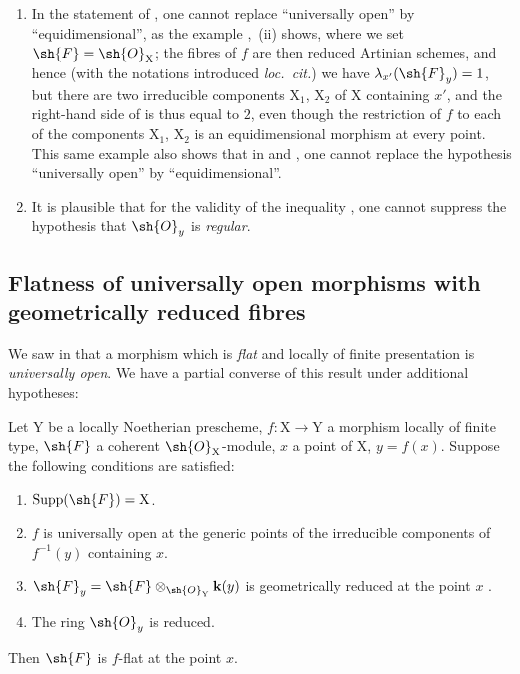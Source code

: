 \begin{remarks}[15.1.4]
\label{IV.15.1.4}
\begin{enumerate}[label=(\roman*)]
  \item In the statement of , one cannot replace ``universally open'' by ``equidimensional'', as the example ,~(ii) shows, where we set $\sh{F}=\sh{O}_\mathrm{X}$; the fibres of $f$ are then reduced Artinian schemes, and hence (with the notations introduced \emph{loc.\ cit.}) we have $\lambda_{x'}(\sh{F}_y)=1$, but there are two irreducible components $\mathrm{X}_1$, $\mathrm{X}_2$ of $\mathrm{X}$ containing $x'$, and the right-hand side of  is thus equal to $2$, even though the restriction of $f$ to each of the components $\mathrm{X}_1$, $\mathrm{X}_2$ is an equidimensional morphism at every point.
This same example also shows that in  and , one cannot replace the hypothesis ``universally open'' by ``equidimensional''.
  \item It is plausible that for the validity of the inequality , one cannot suppress the hypothesis that $\sh{O}_y$ is \emph{regular}.
\end{enumerate}
\end{remarks}

\subsection{Flatness of universally open morphisms with geometrically reduced fibres}
\label{subsection:IV.15.2}

\begin{env}[15.2.1]
\label{IV.15.2.1}
We saw in  that a morphism which is \emph{flat} and locally of finite presentation is \emph{universally open}.
We have a partial converse of this result under additional hypotheses:
\end{env}

\begin{theorem}[15.2.2]
\label{IV.15.2.2}
Let $\mathrm{Y}$ be a locally Noetherian prescheme, $f:\mathrm{X}\to\mathrm{Y}$ a morphism locally of finite type, $\sh{F}$ a coherent $\sh{O}_\mathrm{X}$-module, $x$ a point of $\mathrm{X}$, $y=f(x)$.
Suppose the following conditions are satisfied:
\begin{enumerate}[label=(\roman*)]
  \item $\operatorname{Supp}(\sh{F})=\mathrm{X}$.
  \item $f$ is universally open at the generic points of the irreducible components of $f^{-1}(y)$ containing $x$.
  \item $\sh{F}_y=\sh{F}\otimes_{\sh{O}_\mathrm{Y}}\mathbf{k}(y)$ is geometrically reduced at the point $x$ .
  \item The ring $\sh{O}_y$ is reduced.
\end{enumerate}
Then $\sh{F}$ is $f$-flat at the point $x$.
\end{theorem}

